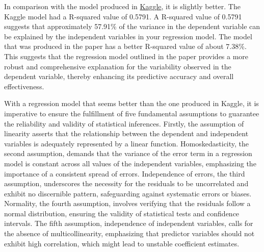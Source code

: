 \documentclass[12pt]{article}
\begin{document}
In comparison with the model produced in \href{https://www.kaggle.com/code/ashydv/housing-price-prediction-linear-regression/notebook}{Kaggle}, it is slightly better. The Kaggle model had a R-squared value of 0.5791. A R-squared value of 0.5791 suggests that approximately 57.91\% of the variance in the dependent variable can be explained by the independent variables in your regression model. The model that was produced in the paper has a better R-squared value of about 7.38\%. This suggests that the regression model outlined in the paper provides a more robust and comprehensive explanation for the variability observed in the dependent variable, thereby enhancing its predictive accuracy and overall effectiveness.

With a regression model that seems better than the one produced in Kaggle, it is imperative to ensure the fulfillment of five fundamental assumptions to guarantee the reliability and validity of statistical inferences. Firstly, the assumption of linearity asserts that the relationship between the dependent and independent variables is adequately represented by a linear function. Homoskedasticity, the second assumption, demands that the variance of the error term in a regression model is constant across all values of the independent variables, emphasizing the importance of a consistent spread of errors. Independence of errors, the third assumption, underscores the necessity for the residuals to be uncorrelated and exhibit no discernible pattern, safeguarding against systematic errors or biases. Normality, the fourth assumption, involves verifying that the residuals follow a normal distribution, ensuring the validity of statistical tests and confidence intervals. The fifth assumption, independence of independent variables, calls for the absence of multicollinearity, emphasizing that predictor variables should not exhibit high correlation, which might lead to unstable coefficient estimates.\cite{CFA}
\end{document}
